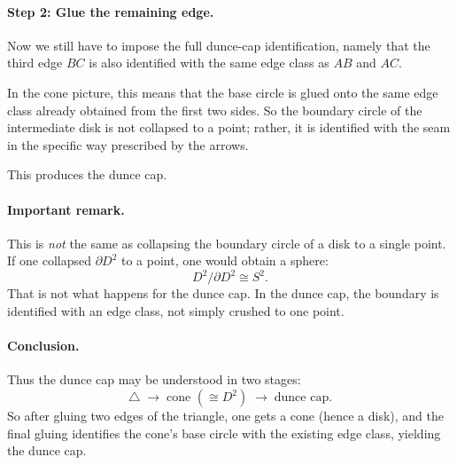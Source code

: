\documentclass[12pt,a4paper]{article}
\theoremstyle{notespace}
\begin{document}
\paragraph{Step 2: Glue the remaining edge.}
Now we still have to impose the full dunce-cap identification, namely that the third edge \(BC\) is also identified with the same edge class as \(AB\) and \(AC\).

In the cone picture, this means that the base circle is glued onto the same edge class already obtained from the first two sides. So the boundary circle of the intermediate disk is not collapsed to a point; rather, it is identified with the seam in the specific way prescribed by the arrows.

This produces the dunce cap.

\paragraph{Important remark.}
This is \emph{not} the same as collapsing the boundary circle of a disk to a single point. If one collapsed \(\partial D^2\) to a point, one would obtain a sphere:
\[
D^2/\partial D^2 \cong S^2.
\]
That is not what happens for the dunce cap. In the dunce cap, the boundary is identified with an edge class, not simply crushed to one point.

\paragraph{Conclusion.}
Thus the dunce cap may be understood in two stages:
\[
\triangle
\;\longrightarrow\;
\text{cone }(\cong D^2)
\;\longrightarrow\;
\text{dunce cap}.
\]
So after gluing two edges of the triangle, one gets a cone (hence a disk), and the final gluing identifies the cone's base circle with the existing edge class, yielding the dunce cap.




\end{document}
